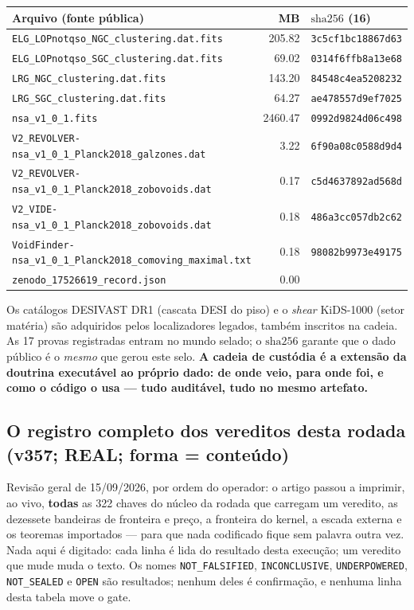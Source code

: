 \documentclass[11pt]{article}
\theoremstyle{definition}\newtheorem{deriv}{Derivação}
\begin{document}
\begin{center}\footnotesize\begin{longtable}{@{}p{}rl@{}}\toprule Arquivo (fonte pública) & MB & $\mathrm{sha}256$ (16) \\ \midrule\endhead \texttt{ELG\_LOPnotqso\_NGC\_clustering.dat.fits} & 205.82 & \texttt{3c5cf1bc18867d63} \\  \texttt{ELG\_LOPnotqso\_SGC\_clustering.dat.fits} & 69.02 & \texttt{0314f6ffb8a13e68} \\  \texttt{LRG\_NGC\_clustering.dat.fits} & 143.20 & \texttt{84548c4ea5208232} \\  \texttt{LRG\_SGC\_clustering.dat.fits} & 64.27 & \texttt{ae478557d9ef7025} \\  \texttt{nsa\_v1\_0\_1.fits} & 2460.47 & \texttt{0992d9824d06c498} \\  \texttt{V2\_REVOLVER-nsa\_v1\_0\_1\_Planck2018\_galzones.dat} & 3.22 & \texttt{6f90a08c0588d9d4} \\  \texttt{V2\_REVOLVER-nsa\_v1\_0\_1\_Planck2018\_zobovoids.dat} & 0.17 & \texttt{c5d4637892ad568d} \\  \texttt{V2\_VIDE-nsa\_v1\_0\_1\_Planck2018\_zobovoids.dat} & 0.18 & \texttt{486a3cc057db2c62} \\  \texttt{VoidFinder-nsa\_v1\_0\_1\_Planck2018\_comoving\_maximal.txt} & 0.18 & \texttt{98082b9973e49175} \\  \texttt{zenodo\_17526619\_record.json} & 0.00 & \texttt{} \\ \bottomrule\end{longtable}\end{center}

Os catálogos DESIVAST DR1 (cascata DESI do piso) e o \emph{shear} KiDS-1000 (setor matéria) são adquiridos pelos localizadores legados, também inscritos na cadeia. As 17 provas registradas entram no mundo selado; o $\mathrm{sha}256$ garante que o dado público é o \emph{mesmo} que gerou este selo. \textbf{A cadeia de custódia é a extensão da doutrina executável ao próprio dado: de onde veio, para onde foi, e como o código o usa --- tudo auditável, tudo no mesmo artefato.}

\subsection*{O registro completo dos vereditos desta rodada (v357; REAL; forma = conteúdo)}

Revisão geral de 15/09/2026, por ordem do operador: o artigo passou a imprimir, ao vivo, \textbf{todas} as 322 chaves do núcleo da rodada que carregam um veredito, as dezessete bandeiras de fronteira e preço, a fronteira do kernel, a escada externa e os teoremas importados --- para que nada codificado fique sem palavra outra vez. Nada aqui é digitado: cada linha é lida do resultado desta execução; um veredito que mude muda o texto. Os nomes \texttt{NOT\_FALSIFIED}, \texttt{INCONCLUSIVE}, \texttt{UNDERPOWERED}, \texttt{NOT\_SEALED} e \texttt{OPEN} são resultados; nenhum deles é confirmação, e nenhuma linha desta tabela move o gate.
\end{document}
